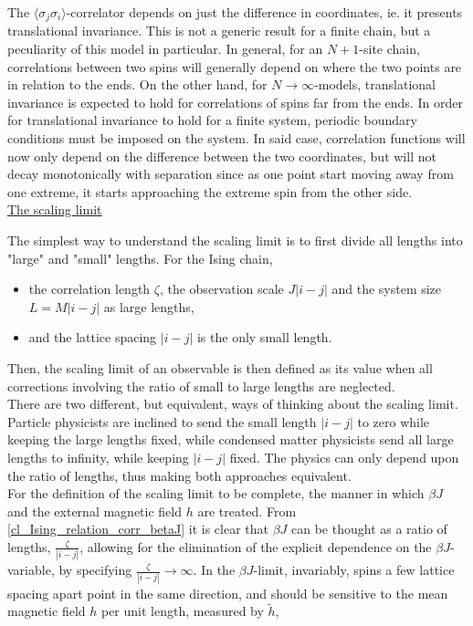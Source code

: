 \documentclass{homework}
\begin{document}
The $\langle \sigma_j \sigma_i \rangle$-correlator depends on just the difference in coordinates, ie. it presents translational invariance. This is not a generic result for a finite chain, but a peculiarity of this model in particular. In general, for an $N+1$-site chain, correlations between two spins will generally depend on where the two points are in relation to the ends. On the other hand, for $N\rightarrow\infty$-models, translational invariance is expected to hold for correlations of spins far from the ends. In order for translational invariance to hold for a finite system, periodic boundary conditions must be imposed on the system. In said case, correlation functions will now only depend on the difference between the two coordinates, but will not decay monotonically with separation since as one point start moving away from one extreme, it starts approaching the extreme spin from the other side. \\

\underline{The scaling limit}

The simplest way to understand the scaling limit is to first divide all lengths into "large" and "small" lengths. For the Ising chain,

\begin{itemize}
    \item the correlation length $\zeta$, the observation scale $J |i-j|$ and the system size $L = M |i-j|$ as large lengths, 
    \item and the lattice spacing $|i-j|$ is the only small length. 
\end{itemize}

Then, the scaling limit of an observable is then defined as its value when all corrections involving the ratio of small to large lengths are neglected. \\

There are two different, but equivalent, ways of thinking about the scaling limit. Particle physicists are inclined to send the small length $|i-j|$ to zero while keeping the large lengths fixed, while condensed matter physicists send all large lengths to infinity, while keeping $|i-j|$ fixed. The physics can only depend upon the ratio of lengths, thus making both approaches equivalent. \\

For the definition of the scaling limit to be complete, the manner in which $\beta J$ and the external magnetic field $h$ are treated. From \cref{cl_Ising_relation_corr_betaJ} it is clear that $\beta J$ can be thought as a ratio of lengths, $\frac{\zeta}{|i-j|}$, allowing for the elimination of the explicit dependence on the $\beta J$-variable, by specifying $\frac{\zeta}{|i-j|} \rightarrow \infty$. In the $\beta J$-limit, invariably, spins a few lattice spacing apart point in the same direction, and should be sensitive to the mean magnetic field $h$ per unit length, measured by $\tilde{h}$,
\end{document}
